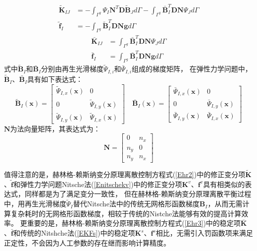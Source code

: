 \begin{subequations}\label{Ehr2}  
\begin{align}   
    \label{Ehr21}    \tilde{\pmb{K}}_{IJ}&=-\int_{\Gamma^g}\Psi_I\pmb{N}^T\pmb{D}\tilde{\pmb B}_Jd\Gamma-\int_{\Gamma^g}\bar{\pmb B}_I^T\pmb{D}\pmb{N}\Psi_Jd\Gamma\\
    \label{Ehr22}   \tilde{\pmb f}_I&=-\int_{\Gamma^g}\tilde{\pmb B}_I^T\pmb D\pmb N\pmb{g}d\Gamma
\end{align}
\end{subequations}
\begin{subequations}\label{Ehr3}
\begin{align} 
    \label{Ehr31}   \bar{\pmb K}_{IJ}&=\int_{\Gamma^g}\bar{\pmb B}_I^T\pmb D\pmb N\Psi_Jd\Gamma\\
    \label{Ehr32}  \bar{\pmb f}_I&=\int_{\Gamma^g}\bar{\pmb B}_I^T\pmb D\pmb N \pmb{g}d\Gamma
\end{align}
\end{subequations}
式中$\tilde{\pmb B}_I$和$\bar{\pmb B}_I$分别由再生光滑梯度$\tilde{\Psi}_{I,i}$和$\bar{\Psi}_{I,i}$组成的梯度矩阵，
在弹性力学问题中，$\tilde{\pmb B}_I$、$\bar{\pmb B}_I$具有如下表达式：
\begin{equation}
    \tilde{\pmb{B}}_I(\pmb{x})= \begin{bmatrix}\tilde{\Psi}_{I,x}(\pmb{x})&0\\0&\tilde{\Psi}_{I,y}(\pmb{x})\\\tilde{\Psi}_{I,y}(\pmb{x})&\tilde{\Psi}_{I,x}(\pmb{x}) \end{bmatrix} 
    \quad
    \bar{\pmb{B}}_I(\pmb{x})= \begin{bmatrix}\bar{\Psi}_{I,x}(\pmb{x})&0\\0&\bar{\Psi}_{I,y}(\pmb{x})\\\bar{\Psi}_{I,y}(\pmb{x})&\bar{\Psi}_{I,x}(\pmb{x}) \end{bmatrix}
\end{equation}
$\pmb N$为法向量矩阵，其表达式为：
\begin{equation}
    \pmb{N}=\begin{bmatrix} 0&n_x\\n_y&0\\n_y&n_x
    \end{bmatrix}
\end{equation}\par
值得注意的是，赫林格-赖斯纳变分原理离散控制方程式(\ref{Ehr2})中的修正变分项$\tilde{\pmb K}$、$\tilde{\pmb f}$和弹性力学问题Nitsche法(\ref{Enitschekv})中的修正变分项$\pmb K^v$、$\pmb f^v$具有相类似的表达式，同样都是为了满足变分一致性，
但在赫林格-赖斯纳变分原理离散平衡过程中，用再生光滑梯度$\tilde{\Psi}_I$替代Nitsche法中的传统无网格形函数梯度$\pmb{B}_I$，从而无需计算复杂耗时的无网格形函数梯度，相较于传统的Nistche法能够有效的提高计算效率。
更重要的是，赫林格-赖斯纳变分原理离散控制方程式(\ref{Ehr3})中的稳定项$\bar{\pmb K}$、$\bar{\pmb f}$和传统的Nitshche法(\ref{EKFs})中的稳定项$\pmb{K}^s$、$\pmb f^s$相比，无需引入罚函数项来满足正定性，不会因为人工参数的存在继而影响计算精度。
